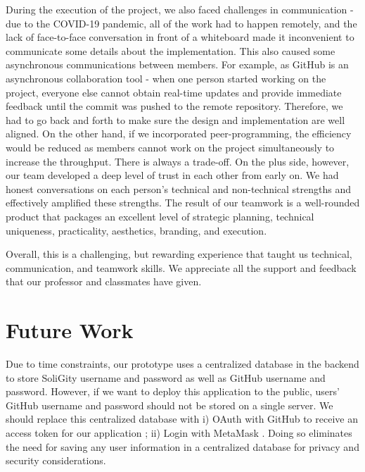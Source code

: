 \documentclass[12pt]{article}
\renewcommand{\_}{\kern-1.5pt\textunderscore\kern-1.5pt}
\begin{document}
During the execution of the project, we also faced challenges in communication - due to the COVID-19 pandemic,
all of the work had to happen remotely, and the lack of face-to-face conversation in front of a whiteboard made
it inconvenient to communicate some details about the implementation. This also caused some asynchronous communications
between members. For example, as GitHub is an asynchronous collaboration tool - when one person started working
on the project, everyone else cannot obtain real-time updates and provide immediate feedback until the commit
was pushed to the remote repository. Therefore, we had to go back and forth to make sure the design and implementation
are well aligned. On the other hand, if we incorporated peer-programming, the efficiency would be reduced as
members cannot work on the project simultaneously to increase the throughput. There is always a trade-off. On
the plus side, however, our team developed a deep level of trust in each other from early on. We had honest
conversations on each person's technical and non-technical strengths and effectively amplified these strengths.
The result of our teamwork is a well-rounded product that packages an excellent level of strategic planning,
technical uniqueness, practicality, aesthetics, branding, and execution.

Overall, this is a challenging, but rewarding experience that taught us technical, communication, and teamwork
skills. We appreciate all the support and feedback that our professor and classmates have given.

\section{Future Work}
Due to time constraints, our prototype uses a centralized database in the backend to store SoliGity username and password as well as GitHub username and password. However, if we want to deploy this application to the public, users' GitHub username and password should not be stored on a single server. We should replace this centralized database with i) OAuth with GitHub to receive an access token for our application \cite{github_developer}; ii) Login with MetaMask \cite{martiny_2018}. Doing so eliminates the need for saving any user information in a centralized database for privacy and security considerations.

\end{document}
